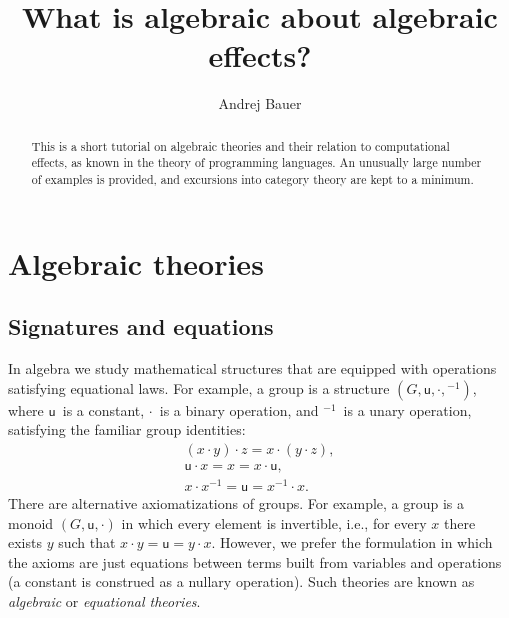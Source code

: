 \documentclass{amsart}
\begin{document}
\title{What is algebraic about algebraic effects?}

\author{Andrej Bauer}

\begin{abstract}
  This is a short tutorial on algebraic theories and their relation to computational
  effects, as known in the theory of programming languages. An unusually large number of
  examples is provided, and excursions into category theory are kept to a minimum.
\end{abstract}

\maketitle

\section{Algebraic theories}
\label{sec:algebraic-theories}


\subsection{Signatures and equations}
\label{sec:signatures-equations}

In algebra we study mathematical structures that are equipped with operations satisfying
equational laws. For example, a group is a structure $(G, \mathsf{u}, {\cdot}, {}^{-1})$,
where $\mathsf{u}$~is a constant, $\cdot$~is a binary operation, and ${}^{-1}$~is a unary
operation, satisfying the familiar group identities:
%
\begin{gather*}
  (x \cdot y) \cdot z = x \cdot (y \cdot z),\\
  \mathsf{u} \cdot x = x = x \cdot \mathsf{u},\\
  x \cdot x^{-1} = \mathsf{u} = x^{-1} \cdot x.
\end{gather*}
%
There are alternative axiomatizations of groups. For example, a group is a monoid
$(G, \mathsf{u}, {\cdot})$ in which every element is invertible, i.e., for every $x$ there
exists $y$ such that $x \cdot y = \mathsf{u} = y \cdot x$. However, we prefer the
formulation in which the axioms are just equations between terms built from variables and
operations (a constant is construed as a nullary operation). Such theories are known as
\emph{algebraic} or \emph{equational theories}.
\end{document}
